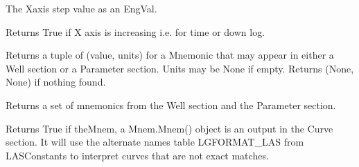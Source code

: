 \documentclass[letterpaper,10pt,english]{sphinxmanual}
\begin{document}
\begin{fulllineitems}
\begin{fulllineitems}
\end{fulllineitems}


\begin{fulllineitems}
\label{\detokenize{ref/LAS/core/LASRead:TotalDepth.LAS.core.LASRead.LASBase.xAxisStep}}
The Xaxis step value as an EngVal.

\end{fulllineitems}


\begin{fulllineitems}
\label{\detokenize{ref/LAS/core/LASRead:TotalDepth.LAS.core.LASRead.LASBase.logDown}}
Returns True if X axis is increasing i.e. for time or down log.

\end{fulllineitems}


\begin{fulllineitems}
\label{\detokenize{ref/LAS/core/LASRead:TotalDepth.LAS.core.LASRead.LASBase.getWsdMnem}}
Returns a tuple of (value, units) for a Mnemonic that may appear in either a
Well section or a Parameter section. Units may be None if empty.
Returns (None, None) if nothing found.

\end{fulllineitems}


\begin{fulllineitems}
\label{\detokenize{ref/LAS/core/LASRead:TotalDepth.LAS.core.LASRead.LASBase.getAllWsdMnemonics}}
Returns a set of mnemonics from the Well section and the Parameter section.

\end{fulllineitems}


\begin{fulllineitems}
\label{\detokenize{ref/LAS/core/LASRead:TotalDepth.LAS.core.LASRead.LASBase.hasOutpMnem}}
Returns True if theMnem, a Mnem.Mnem() object is an output in the Curve section.
It will use the alternate names table LGFORMAT\_LAS from LASConstants to interpret 
curves that are not exact matches.


\end{fulllineitems}
\end{fulllineitems}
\end{document}
